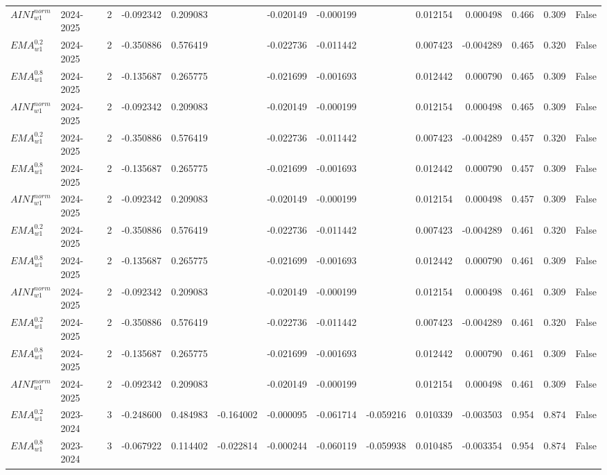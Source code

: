 \begin{tabular}{@{}llrrrrrrrrrlll@{}}
$AINI^{norm}_{w1}$ & 2024-2025 & 2 & -0.092342 & 0.209083 &  & -0.020149 & -0.000199 &  & 0.012154 & 0.000498 & 0.466 & 0.309 & False \\
$EMA^{0.2}_{w1}$ & 2024-2025 & 2 & -0.350886 & 0.576419 &  & -0.022736 & -0.011442 &  & 0.007423 & -0.004289 & 0.465 & 0.320 & False \\
$EMA^{0.8}_{w1}$ & 2024-2025 & 2 & -0.135687 & 0.265775 &  & -0.021699 & -0.001693 &  & 0.012442 & 0.000790 & 0.465 & 0.309 & False \\
$AINI^{norm}_{w1}$ & 2024-2025 & 2 & -0.092342 & 0.209083 &  & -0.020149 & -0.000199 &  & 0.012154 & 0.000498 & 0.465 & 0.309 & False \\
$EMA^{0.2}_{w1}$ & 2024-2025 & 2 & -0.350886 & 0.576419 &  & -0.022736 & -0.011442 &  & 0.007423 & -0.004289 & 0.457 & 0.320 & False \\
$EMA^{0.8}_{w1}$ & 2024-2025 & 2 & -0.135687 & 0.265775 &  & -0.021699 & -0.001693 &  & 0.012442 & 0.000790 & 0.457 & 0.309 & False \\
$AINI^{norm}_{w1}$ & 2024-2025 & 2 & -0.092342 & 0.209083 &  & -0.020149 & -0.000199 &  & 0.012154 & 0.000498 & 0.457 & 0.309 & False \\
$EMA^{0.2}_{w1}$ & 2024-2025 & 2 & -0.350886 & 0.576419 &  & -0.022736 & -0.011442 &  & 0.007423 & -0.004289 & 0.461 & 0.320 & False \\
$EMA^{0.8}_{w1}$ & 2024-2025 & 2 & -0.135687 & 0.265775 &  & -0.021699 & -0.001693 &  & 0.012442 & 0.000790 & 0.461 & 0.309 & False \\
$AINI^{norm}_{w1}$ & 2024-2025 & 2 & -0.092342 & 0.209083 &  & -0.020149 & -0.000199 &  & 0.012154 & 0.000498 & 0.461 & 0.309 & False \\
$EMA^{0.2}_{w1}$ & 2024-2025 & 2 & -0.350886 & 0.576419 &  & -0.022736 & -0.011442 &  & 0.007423 & -0.004289 & 0.461 & 0.320 & False \\
$EMA^{0.8}_{w1}$ & 2024-2025 & 2 & -0.135687 & 0.265775 &  & -0.021699 & -0.001693 &  & 0.012442 & 0.000790 & 0.461 & 0.309 & False \\
$AINI^{norm}_{w1}$ & 2024-2025 & 2 & -0.092342 & 0.209083 &  & -0.020149 & -0.000199 &  & 0.012154 & 0.000498 & 0.461 & 0.309 & False \\
$EMA^{0.2}_{w1}$ & 2023-2024 & 3 & -0.248600 & 0.484983 & -0.164002 & -0.000095 & -0.061714 & -0.059216 & 0.010339 & -0.003503 & 0.954 & 0.874 & False \\
$EMA^{0.8}_{w1}$ & 2023-2024 & 3 & -0.067922 & 0.114402 & -0.022814 & -0.000244 & -0.060119 & -0.059938 & 0.010485 & -0.003354 & 0.954 & 0.874 & False \\

\end{tabular}
